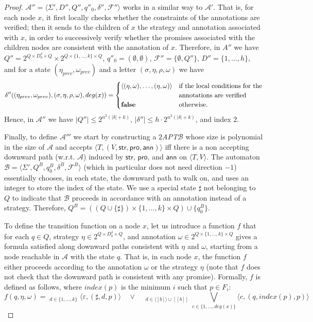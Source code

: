 \documentclass{LMCS}
\theoremstyle{plain}
\def \A             {\mathcal{A}}
\def \ann           {\ensuremath{\mathsf{ann}}\xspace}
\def \B             {\mathcal{B}}
\def \degree        {deg}
\def \F             {\mathcal{F}}
\def \prom          {\ensuremath{\mathsf{pro}}\xspace}
\def \strat         {\ensuremath{\mathsf{str}}\xspace}
\def \TAPT          {\emph{$2$APT}\xspace}
\newcommand \tpl[1] {\langle #1 \rangle}
\begin{document}
\begin{proof}
$\A'' = \tpl{\Sigma', D'', Q'', q''_0, \delta'', \F''}$ works in a
similar way to $\A'$. That is, for each node $x$, it first locally
checks whether the constraints of the annotations are verified;
then it sends to the children of $x$ the strategy and annotation
associated with $x$, in order to successively verify whether the
promises associated with the children nodes are consistent with
the annotation of $x$. Therefore, in $A''$ we have $Q'' = 2^{Q
\times D_b^{\delta} \times Q} \times 2^{Q \times \{1, \ldots, k\}
\times Q}$, $q''_0 = (\emptyset, \emptyset)$, $\F'' = \{\emptyset,
Q''\}$, $D'' = \{1, \ldots, h\}$, and for a state $(\eta_{prev},
\omega_{prev})$ and a letter $(\sigma, \eta, \rho, \omega)$ we
have {\small
    $$\delta''((\eta_{prev}, \omega_{prev}), (\sigma, \eta, \rho, \omega), \degree(x)) = \begin{cases}
        \tpl{(\eta,\omega), \ldots, (\eta,\omega)} & \mbox{if the local conditions for the} \\
                                                   & \mbox{annotations are verified} \\
        {\bf false}                                & \mbox{otherwise.}
    \end{cases}$$}
Hence, in $\A''$ we have $|Q''| \leq 2^{n^2(|\delta|+k)}$,
$|\delta''| \leq h \cdot 2^{n^2(|\delta|+k)}$, and index $2$.

Finally, to define $\A'''$ we start by constructing a \TAPT $\B$
whose size is polynomial in the size of $\A$ and accepts
$\tpl{T,(V,\strat,\prom,\ann)}$ iff there is a non accepting
downward path (w.r.t. $\A$) induced by $\strat$, $\prom$, and
$\ann$ on $\tpl{T,V}$. The automaton $\B = \tpl{\Sigma', Q^B,
q_0^B, \delta^B, \F^B}$ (which in particular does not need
direction $-1$) essentially chooses, in each state, the downward
path to walk on, and uses an integer to store the index of the
state. We use a special state $\sharp$ not belonging to $Q$ to
indicate that $\B$ proceeds in accordance with an annotation
instead of a strategy. Therefore, $Q^B = ((Q \cup \{\sharp\})
\times \{1, \ldots, k\} \times Q) \cup \{q_0^B\}$.

To define the transition function on a node $x$, let us introduce
a function $f$ that for each $q \in Q$, strategy $\eta \in 2^{Q
\times D_b^{\delta} \times Q}$, and annotation $\omega \in 2^{Q
\times \{1, \ldots, k\} \times Q}$ gives a formula satisfied along
downward paths consistent with $\eta$ and $\omega$, starting from
a node reachable in $\A$ with the state $q$. That is, in each node
$x$, the function $f$ either proceeds according to the annotation
$\omega$ or the strategy $\eta$ (note that $f$ does not check that
the downward path is consistent with any promise). Formally, $f$
is defined as follows, where $index(p)$ is the minimum $i$ such
that $p \in F_i$: {\small
    $$f(q, \eta, \omega) = \mathop{\bigvee_{(q, d, p) \in \omega}}_{d \in \{1, \ldots, k\}}
        \tpl{\varepsilon, (\sharp, d, p)} \hspace{1em} \vee \hspace{1em}
        \mathop{\bigvee_{(q, d, p) \in \eta}}_{d \in \tpl{[b]} \cup [[b]]}
        \bigvee_{c \in \{1, \ldots, \degree(x)\}} \tpl{c, (q, index(p), p)}$$}


\end{proof}
\end{document}
